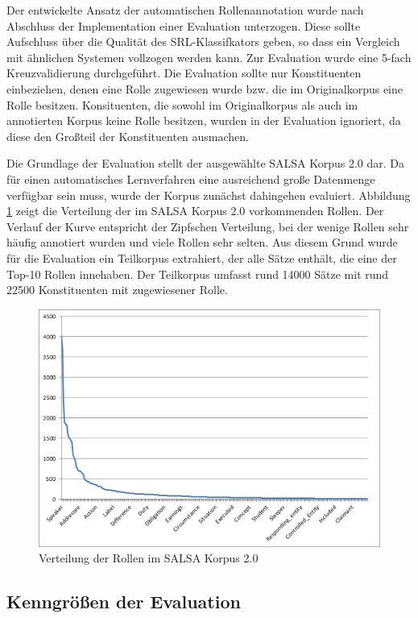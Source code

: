 \documentclass[12pt]{article}
\begin{document}
Der entwickelte Ansatz der automatischen Rollenannotation wurde nach Abschluss
der Implementation einer Evaluation unterzogen. Diese sollte Aufschluss über die
Qualität des SRL-Klassifkators geben, so dass ein Vergleich mit ähnlichen
Systemen vollzogen werden kann. Zur Evaluation wurde eine 5-fach Kreuzvalidierung durchgeführt. Die Evaluation sollte nur Konstituenten einbeziehen, denen eine Rolle zugewiesen wurde bzw. die im Originalkorpus eine Rolle besitzen. Konsituenten, die sowohl im Originalkorpus als auch im annotierten Korpus keine Rolle besitzen, wurden in der Evaluation ignoriert, da diese den Großteil der Konstituenten ausmachen.

Die Grundlage der Evaluation stellt der ausgewählte SALSA Korpus 2.0 dar. Da für einen automatisches Lernverfahren eine ausreichend große Datenmenge verfügbar sein muss, wurde der Korpus zunächst dahingehen evaluiert. Abbildung \ref{roleFrequency} zeigt die Verteilung der im SALSA Korpus 2.0 vorkommenden Rollen. Der Verlauf der Kurve entspricht der Zipfschen Verteilung, bei der wenige Rollen sehr häufig annotiert wurden und viele Rollen sehr selten. Aus diesem Grund wurde für die Evaluation ein Teilkorpus extrahiert, der alle Sätze enthält, die eine der Top-10 Rollen innehaben. Der Teilkorpus umfasst rund 14000 Sätze mit rund 22500 Konstituenten mit zugewiesener Rolle.

	\begin{figure}[tb!]
		\centering
		\includegraphics[scale=0.6]{images/roleFrequency.jpg}
		\caption{Verteilung der Rollen im SALSA Korpus 2.0}
		\label{roleFrequency}
	\end{figure}


\subsection{Kenngrößen der Evaluation}
\end{document}
